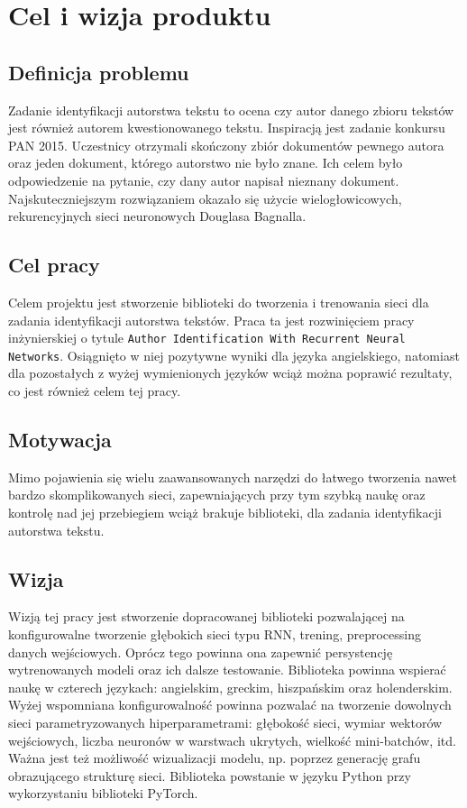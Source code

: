 \newpage
\section{Cel i wizja produktu}

\subsection{Definicja problemu}
Zadanie identyfikacji autorstwa tekstu to ocena czy autor danego zbioru tekstów jest również 
autorem kwestionowanego tekstu. Inspiracją jest zadanie konkursu PAN 2015. Uczestnicy otrzymali 
skończony zbiór dokumentów pewnego autora oraz jeden dokument, którego autorstwo nie było znane.
Ich celem było odpowiedzenie na pytanie, czy dany autor napisał nieznany dokument.
Najskuteczniejszym rozwiązaniem okazało się użycie wielogłowicowych, rekurencyjnych sieci 
neuronowych Douglasa Bagnalla.

 
\subsection{Cel pracy}
Celem projektu jest stworzenie biblioteki do tworzenia i trenowania sieci dla zadania 
identyfikacji autorstwa tekstów. Praca ta jest rozwinięciem pracy inżynierskiej o tytule 
\texttt{Author Identification With Recurrent Neural Networks}. Osiągnięto w niej pozytywne wyniki dla języka 
angielskiego, natomiast dla pozostałych z wyżej wymienionych języków wciąż można poprawić rezultaty,
co jest również celem tej pracy.


\subsection{Motywacja}
Mimo pojawienia się wielu zaawansowanych narzędzi do łatwego tworzenia nawet bardzo skomplikowanych sieci, 
zapewniających przy tym szybką naukę oraz kontrolę nad jej przebiegiem wciąż brakuje biblioteki, dla zadania identyfikacji autorstwa 
tekstu.

\subsection{Wizja}
Wizją tej pracy jest stworzenie dopracowanej biblioteki pozwalającej na konfigurowalne tworzenie 
głębokich sieci typu RNN, trening, preprocessing danych wejściowych. Oprócz tego powinna ona 
zapewnić persystencję wytrenowanych modeli oraz ich dalsze testowanie. Biblioteka powinna wspierać 
naukę w czterech językach: angielskim, greckim, hiszpańskim oraz holenderskim. Wyżej wspomniana konfigurowalność powinna 
pozwalać na tworzenie dowolnych sieci parametryzowanych hiperparametrami: głębokość sieci, wymiar 
wektorów wejściowych, liczba neuronów w warstwach ukrytych, wielkość mini-batchów, itd. Ważna jest 
też możliwość wizualizacji modelu, np. poprzez generację grafu obrazującego strukturę sieci. 
Biblioteka powstanie w języku Python przy wykorzystaniu biblioteki PyTorch.

